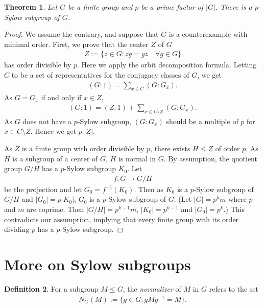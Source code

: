 \documentclass[12pt]{report}
\theoremstyle{plain}
\newtheorem{theorem}{Theorem}[section]
\theoremstyle{remark}
\theoremstyle{definition}
\newtheorem{definition}[theorem]{Definition}
\begin{document}
\begin{theorem}
    Let $G$ be a finite group and $p$ be a prime factor of $|G|$. There is a $p$-Sylow subgroup of $G$.
\end{theorem}
\begin{proof}
    We assume the contrary, and suppose that $G$ is a counterexample with minimal order. First, we prove that the center $Z$ of $G$
    \begin{align*}
        Z:=\{z\in G:zg=gz\quad \forall g\in G\}
    \end{align*}
    has order divisible by $p$. Here we apply the orbit decomposition formula. Letting $C$ to be a set of representatives for the conjugacy classes of $G$, we get
    \begin{align*}
        (G:1)=\sum_{x\in C}(G:G_x).
    \end{align*}
    As $G=G_x$ if and only if $x\in Z$,
    \begin{align*}
        (G:1)=(Z:1)+\sum_{x\in C\setminus Z} (G:G_x).
    \end{align*}
    As $G$ does not have a $p$-Sylow subgroup, $(G:G_x)$ should be a multiple of $p$ for $x\in C\setminus Z$. Hence we get $p||Z|$.

    As $Z$ is a finite group with order divisible by $p$, there exists $H\le Z$ of order $p$. As $H$ is a subgroup of a center of $G$, $H$ is normal in $G$. By assumption, the quotient group $G/H$ has a $p$-Sylow subgroup $K_0$. Let
    \begin{align*}
        f:G\rightarrow G/H
    \end{align*}
    be the projection and let $G_0 = f^{-1}(K_0)$. Then as $K_0$ is a $p$-Sylow subgroup of $G/H$ and $|G_0|=p|K_0|$, $G_0$ is a $p$-Sylow subgroup of $G$. (Let $|G|=p^k m$ where $p$ and $m$ are coprime. Then $|G/H|=p^{k-1}m$, $|K_0|=p^{k-1}$ and $|G_0|=p^k$.) This contradicts our assumption, implying that every finite group with its order dividing $p$ has a $p$-Sylow subgroup.
\end{proof}


\section{More on Sylow subgroups}
\begin{definition}
    For a subgroup $M\le G$, the \emph{normalizer} of $M$ in $G$ refers to the set
    \begin{align*}
        N_G(M):=\{g\in G:gMg^{-1}=M\}.
    \end{align*}
\end{definition}
\end{document}
